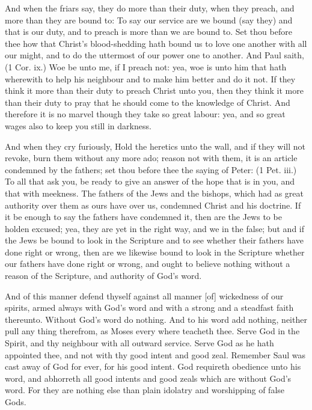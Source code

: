 And when the friars say, they do more than their duty,
when they preach, and more than they are bound to: To
say our service are we bound (say they) and that is our
duty, and to preach is more than we are bound to. Set 
thou before thee how that Christ's blood-shedding hath 
bound us to love one another with all our might, and to do 
the uttermost of our power one to another. And Paul 
saith, (1 Cor. ix.) Woe be unto me, if I preach not: yea, 
woe is unto him that hath wherewith to help his neighbour 
and to make him better and do it not. If they think it 
more than their duty to preach Christ unto you, then they 
think it more than their duty to pray that he should come 
to the knowledge of Christ. And therefore it is no marvel 
though they take so great labour: yea, and so great wages 
also to keep you still in darkness. 

And when they cry furiously, Hold the heretics unto 
the wall, and if they will not revoke, burn them without 
any more ado; reason not with them, it is an article condemned
by the fathers; set thou before thee the saying 
of Peter: (1 Pet. iii.) To all that ask you, be ready to 
give an answer of the hope that is in you, and that with 
meekness. The fathers of the Jews and the bishops, 
which had as great authority over them as ours have over 
us, condemned Christ and his doctrine. If it be enough 
to say the fathers have condemned it, then are the Jews 
to be holden excused; yea, they are yet in the right way, 
and we in the false; but and if the Jews be bound to 
look in the Scripture and to see whether their fathers 
have done right or wrong, then are we likewise bound to 
look in the Scripture whether our fathers have done right 
or wrong, and ought to believe nothing without a reason 
of the Scripture, and authority of God's word. 

And of this manner defend thyself against all manner [of] 
wickedness of our spirits, armed always with God's word 
and with a strong and a steadfast faith thereunto. Without
God's word do nothing. And to his word add nothing, 
neither pull any thing therefrom, as Moses every where 
teacheth thee. Serve God in the Spirit, and thy 
neighbour with all outward service. Serve God as 
he hath appointed thee, and not with thy good intent 
and good zeal. Remember Saul was cast away of 
God for ever, for his good intent. God requireth 
obedience unto his word, and abhorreth all good intents 
and good zeals which are without God's word. For they 
are nothing else than plain idolatry and worshipping of 
false Gods. 

